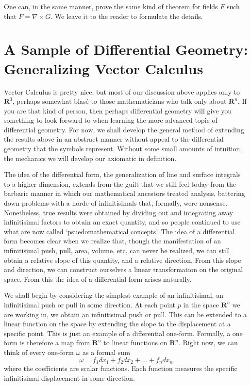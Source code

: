 One can, in the same manner, prove the same kind of theorem for fields $F$ such that $F = \nabla \times G$. We leave it to the reader to formulate the details.

\section{A Sample of Differential Geometry: Generalizing Vector Calculus}

Vector Calculus is pretty nice, but most of our discussion above applies only to $\mathbf{R}^3$, perhaps somewhat blas\'{e} to those mathematicians who talk only about $\mathbf{R}^n$. If you are that kind of person, then perhaps differential geometry will give you something to look forward to when learning the more advanced topic of differential geometry. For now, we shall develop the general method of extending the results above in an abstract manner without appeal to the differential geometry that the symbols represent. Without some small amounts of intuition, the mechanics we will develop our axiomatic in definition.

The idea of the differential form, the generalization of line and surface integrals to a higher dimension, extends from the guilt that we still feel today from the barbaric manner in which our mathematical ancestors treated analysis, battering down problems with a horde of infinitisimals that, formally, were nonsense. Nonetheless, true results were obtained by dividing out and integrating away infinitisimal factors to obtain an exact quantity, and so people continued to use what are now called `psuedomathematical concepts'. The idea of a differential form becomes clear when we realize that, though the manifestation of an infinitisimal push, pull, area, volume, etc, can never be realized, we can still obtain a relative slope of this quantity, and a relative direction. From this slope and direction, we can construct ourselves a linear transformation on the original space. From this the idea of a differential form arises naturally.

We shall begin by considering the simplest example of an infinitisimal, an infinitisimal push or pull in some direction. At each point $p$ in the space $\mathbf{R}^n$ we are working in, we obtain an infinitisimal push or pull. This can be extended to a linear function on the space by extending the slope to the displacement at a specific point. This is just an example of a differential one-form. Formally, a one form is therefore a map from $\mathbf{R}^n$ to linear functions on $\mathbf{R}^n$. Right now, we can think of every one-form $\omega$ as a formal sum
%
\[ \omega = f_1 dx_1 + f_2 dx_2 + \dots + f_n dx_n \]
%
where the coefficients are scalar functions. Each function measures the specific infinitisimal displacement in some direction.

